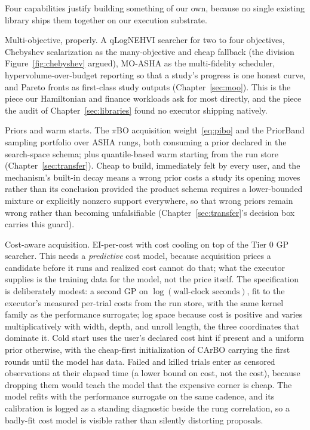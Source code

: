 Four capabilities justify building something of our own, because no single
existing library ships them together on our execution substrate.

Multi-objective, properly. A qLogNEHVI searcher for two to four objectives,
Chebyshev scalarization as the many-objective and cheap fallback (the
division Figure~\ref{fig:chebyshev} argued), MO-ASHA as the
multi-fidelity scheduler, hypervolume-over-budget reporting so that a
study's progress is one honest curve, and Pareto fronts as first-class
study outputs (Chapter~\ref{sec:moo}). This is the piece our Hamiltonian
and finance workloads ask for most directly, and the piece the audit of
Chapter~\ref{sec:libraries} found no executor shipping natively.

Priors and warm starts. The $\pi$BO acquisition weight~\eqref{eq:pibo}
and the PriorBand sampling portfolio over ASHA rungs, both consuming a
prior declared in the search-space schema; plus quantile-based warm
starting from the run store (Chapter~\ref{sec:transfer}). Cheap to
build, immediately felt by every user, and the mechanism's built-in
decay means a wrong prior costs a study its opening moves rather than
its conclusion provided the product schema requires a lower-bounded
mixture or explicitly nonzero support everywhere, so that wrong priors
remain wrong rather than becoming unfalsifiable
(Chapter~\ref{sec:transfer}'s decision box carries this guard).

Cost-aware acquisition. EI-per-cost with cost cooling
\citep{lee2020carbo} on top of the Tier 0 GP searcher. This needs a
\emph{predictive} cost model, because acquisition prices a candidate
before it runs and realized cost cannot do that; what the executor
supplies is the training data for the model, not the price itself. The
specification is deliberately modest: a second GP on
$\log(\text{wall-clock seconds})$, fit to the executor's measured
per-trial costs from the run store, with the same kernel family as the
performance surrogate; log space because cost is positive and varies
multiplicatively with width, depth, and unroll length, the three
coordinates that dominate it. Cold start uses the user's declared cost
hint if present and a uniform prior otherwise, with the cheap-first
initialization of CArBO carrying the first rounds until the model has
data. Failed and killed trials enter as censored observations at their
elapsed time (a lower bound on cost, not the cost), because dropping
them would teach the model that the expensive corner is cheap. The
model refits with the performance surrogate on the same cadence, and
its calibration is logged as a standing diagnostic beside the rung
correlation, so a badly-fit cost model is visible rather than silently
distorting proposals.

